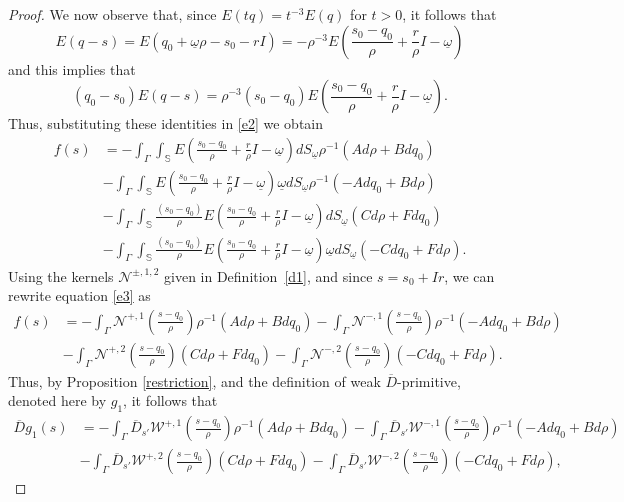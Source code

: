 \documentclass[reqno,11pt]{amsart}
\numberwithin{equation}{section}
\theoremstyle{definition}
\begin{document}
\begin{proof}
We now observe that, since $E(tq)=t^{-3}E(q)$ for $t>0$, it follows that
	$$ E(q-s)=E(q_0+\underline{\omega} \rho -s_0-rI)=-\rho^{-3} E\left( \frac{s_0-q_0}{\rho}+\frac r\rho I - \underline{\omega} \right)$$
	and this implies that
	$$ (q_0-s_0)E(q-s)=\rho^{-3} (s_0-q_0) E\left( \frac{s_0-q_0}{\rho}+\frac r\rho I - \underline{\omega} \right).$$
	Thus, substituting these identities in \eqref{e2} we obtain
	\begin{align}\label{e3}
		f(s) & =-\int_{\Gamma} \int_{\mathbb S}  E\left( \frac{s_0-q_0}{\rho}+\frac r\rho I - \underline{\omega} \right) dS_{\underline{\omega}} \rho^{-1} (Ad\rho +Bdq_0)\nonumber\\
		&-\int_{\Gamma}\int_{\mathbb S}  E\left( \frac{s_0-q_0}{\rho}+\frac r\rho I - \underline{\omega} \right)  \underline{\omega} dS_{\underline{\omega}} \rho^{-1} (-Adq_0 +Bd\rho)\\
		&-\int_{\Gamma} \int_{\mathbb S}  \frac{(s_0-q_0)}{\rho} E\left( \frac{s_0-q_0}{\rho}+\frac r\rho I - \underline{\omega} \right) dS_{\underline{\omega}}  (Cd\rho +Fdq_0)\nonumber\\
		&-\int_{\Gamma}\int_{\mathbb S}  \frac{(s_0-q_0)}{\rho} E\left( \frac{s_0-q_0}{\rho}+\frac r\rho I - \underline{\omega} \right)  \underline{\omega} dS_{\underline{\omega}} (-Cdq_0 +Fd\rho). \nonumber
	\end{align}
Using the kernels $\mathcal{N}^{\pm, 1,2}$ given in Definition~\ref{d1}, and since $s=s_0+Ir$, we can rewrite equation \eqref{e3} as
	\begin{align}\label{e4}
		f(s) & =-\int_{\Gamma} \mathcal N^{+,1} \left( \frac{s-q_0}{\rho} \right) \rho^{-1} (Ad\rho +Bdq_0)-\int_{\Gamma} \mathcal N^{-,1} \left( \frac{s-q_0}{\rho} \right) \rho^{-1} (-Adq_0 +Bd\rho)\\
		&-\int_{\Gamma} \mathcal N^{+,2} \left( \frac{s-q_0}{\rho} \right)   (Cd\rho +Fdq_0)-\int_{\Gamma} \mathcal N^{-,2} \left( \frac{s-q_0}{\rho} \right)   (-Cdq_0 +Fd\rho). \nonumber
	\end{align}
	Thus, by Proposition \ref{restriction}, and the definition of weak $\overline{D}$-primitive, denoted here by $g_1$, it follows that
	\begin{align*}
		\overline D g_1(s)& =-\int_{\Gamma} \overline{D}_{s'} \mathcal W^{+,1} \left( \frac{s-q_0}{\rho} \right) \rho^{-1} (Ad\rho +Bdq_0)-\int_{\Gamma} \overline{D}_{s'} \mathcal W^{-,1} \left( \frac{s-q_0}{\rho} \right)  \rho^{-1} (-Adq_0 +Bd\rho)\\
		&-\int_{\Gamma} \overline{D}_{s'} \mathcal W^{+,2} \left( \frac{s-q_0}{\rho} \right)  (Cd\rho +Fdq_0)-\int_{\Gamma} \overline{D}_{s'} \mathcal W^{-,2} \left( \frac{s-q_0}{\rho} \right)  (-Cdq_0 +Fd\rho),

\end{align*}
\end{proof}
\end{document}

